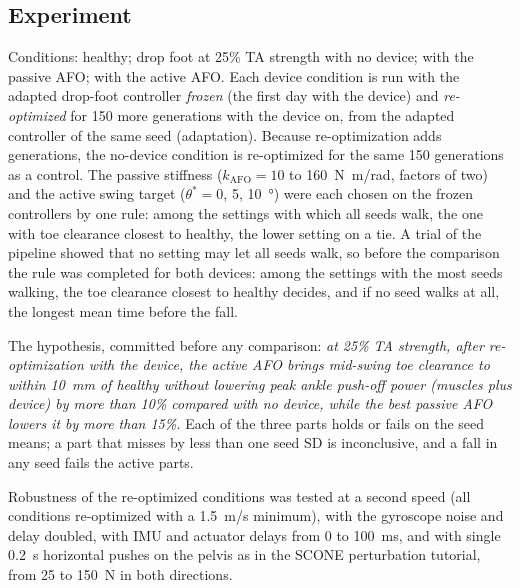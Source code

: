 \subsection{Experiment}
Conditions: healthy; drop foot at 25\% TA strength with no device; with the passive AFO; with the active AFO. Each device condition is run with the adapted drop-foot controller \emph{frozen} (the first day with the device) and \emph{re-optimized} for 150 more generations with the device on, from the adapted controller of the same seed (adaptation). Because re-optimization adds generations, the no-device condition is re-optimized for the same 150 generations as a control. The passive stiffness ($k_\text{AFO} = 10$ to \SI{160}{N.m/rad}, factors of two) and the active swing target ($\theta^* = 0$, 5, \SI{10}{\degree}) were each chosen on the frozen controllers by one rule: among the settings with which all seeds walk, the one with toe clearance closest to healthy, the lower setting on a tie. A trial of the pipeline showed that no setting may let all seeds walk, so before the comparison the rule was completed for both devices: among the settings with the most seeds walking, the toe clearance closest to healthy decides, and if no seed walks at all, the longest mean time before the fall.

The hypothesis, committed before any comparison: \emph{at 25\% TA strength, after re-optimization with the device, the active AFO brings mid-swing toe clearance to within 10~mm of healthy without lowering peak ankle push-off power (muscles plus device) by more than 10\% compared with no device, while the best passive AFO lowers it by more than 15\%.} Each of the three parts holds or fails on the seed means; a part that misses by less than one seed SD is inconclusive, and a fall in any seed fails the active parts.

Robustness of the re-optimized conditions was tested at a second speed (all conditions re-optimized with a 1.5~m/s minimum), with the gyroscope noise and delay doubled, with IMU and actuator delays from 0 to 100~ms, and with single \SI{0.2}{s} horizontal pushes on the pelvis as in the SCONE perturbation tutorial, from 25 to 150~N in both directions.
